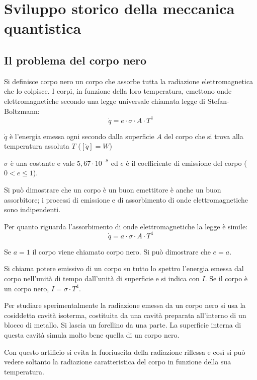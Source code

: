 \section{Sviluppo storico della meccanica quantistica}
    \subsection{Il problema del corpo nero}
        \par Si definisce corpo nero un corpo che assorbe tutta la radiazione elettromagnetica che lo colpisce. I corpi, in funzione della loro temperatura, emettono onde elettromagnetiche secondo una legge universale chiamata legge di Stefan-Boltzmann:
        \begin{equation}
            \dot{q} = e \cdot \sigma \cdot A \cdot T^4
        \end{equation}
        \par $\dot{q}$ è l'energia emessa ogni secondo dalla superficie $A$ del corpo che si trova alla temperatura assoluta $T$ ($[\dot{q}] = W$)
        \par $\sigma$ è una costante e vale $5,67\cdot10^{-8}$ ed $e$ è il coefficiente di emissione del corpo ($0<e\leq1$).
        \par Si può dimostrare che un corpo è un buon emettitore è anche un buon assorbitore; i processi di emissione e di assorbimento di onde elettromagnetiche sono indipendenti.
        \par Per quanto riguarda l'assorbimento di onde elettromagnetiche la legge è simile:
        \begin{equation}
            \dot{q}=a\cdot\sigma\cdot A\cdot T^4
        \end{equation}
        \par Se $a=1$ il corpo viene chiamato corpo nero. Si può dimostrare che $e=a$.
        \par Si chiama potere emissivo di un corpo su tutto lo spettro l'energia emessa dal corpo nell'unità di tempo dall'unità di superficie e si indica con $I$. Se il corpo è un corpo nero, $I=\sigma\cdot T^4$.
        \par Per studiare sperimentalmente la radiazione emessa da un corpo nero si usa la cosiddetta cavità isoterma, costituita da una cavità preparata all'interno di un blocco di metallo. Si lascia un forellino da una parte. La superficie interna di questa cavità simula molto bene quella di un corpo nero.
        \par Con questo artificio si evita la fuoriuscita della radiazione riflessa e così si può vedere soltanto la radiazione caratteristica del corpo in funzione della sua temperatura.
